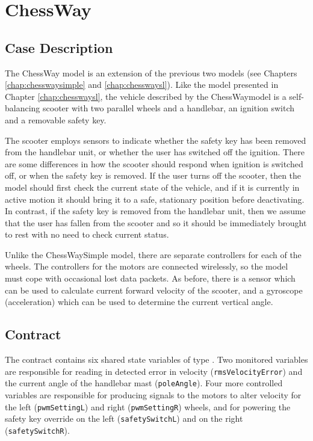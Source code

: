 \chapter{ChessWay \DESTECS} \label{chap:chesswaydestecs}
\section{Case Description} The ChessWay \DESTECS model is an
extension of the previous two models (see Chapters
\ref{chap:chesswaysimple} and \ref{chap:chesswaysl}). Like the model
presented in Chapter \ref{chap:chesswaysl}, the vehicle described by
the ChessWay\DESTECS model is a self-balancing scooter with two parallel
wheels and a handlebar, an ignition switch and a removable safety key.

The scooter employs sensors to indicate whether the safety key has
been removed from the handlebar unit, or whether the user has switched
off the ignition. There are some differences in how the scooter should
respond when ignition is switched off, or when the safety key is
removed. If the user turns off the scooter, then the model should
first check the current state of the vehicle, and if it is currently
in active motion it should bring it to a safe, stationary position
before deactivating. In contrast, if the safety key is removed from
the handlebar unit, then we assume that the user has fallen from the
scooter and so it should be immediately brought to rest with no need
to check current status.

Unlike the ChessWaySimple model, there are separate controllers for
each of the wheels.  The controllers for the motors are connected
wirelessly, so the model must cope with occasional lost data packets.
As before, there is a sensor which can be used to calculate current
forward velocity of the scooter, and a gyroscope (acceleration) which
can be used to determine the current vertical angle.

\section{Contract} The contract contains six shared state variables of
type {\textbf{}}. Two monitored variables are responsible for
reading in detected error in velocity
(\texttt{rmsVelocityError}) and the current angle of the
handlebar mast (\texttt{poleAngle}). Four more controlled
variables are responsible for producing signals to the motors to
alter velocity for the left (\texttt{pwmSettingL}) and right
(\texttt{pwmSettingR}) wheels, and for powering the safety key
override on the left (\texttt{safetySwitchL}) and on the right
(\texttt{safetySwitchR}).

